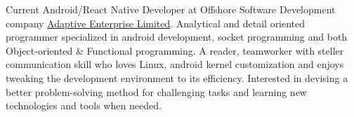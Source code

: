 

\begin{cvparagraph}

Current Android/React Native Developer at Offshore Software Development company {\href{http://ael-bd.com}{Adaptive Enterprise Limited}}. 
Analytical and detail oriented programmer specialized in android development, socket programming and both Object-oriented \& Functional programming. 
A reader, teamworker with steller communication skill who loves Linux, android kernel customization and enjoys tweaking the development environment to its efficiency. 
Interested in devising a better problem-solving method for challenging tasks and learning new technologies and tools when needed.
\end{cvparagraph}

